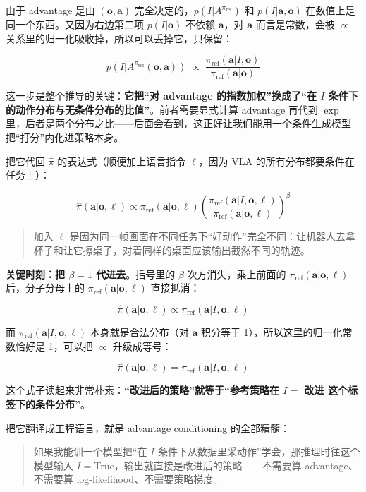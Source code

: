 \documentclass[
  chinese,
]{ctexart}
\begin{document}
由于 advantage 是由 \((\mathbf{o},\mathbf{a})\)
完全决定的，\(p(I|A^{\pi_\text{ref}})\) 和
\(p(I|\mathbf{a},\mathbf{o})\) 在数值上是同一个东西。又因为右边第二项
\(p(I|\mathbf{o})\) 不依赖 \(\mathbf{a}\)，对 \(\mathbf{a}\)
而言是常数，会被 \(\propto\)
关系里的归一化吸收掉，所以可以丢掉它，只保留：

\[
p(I | A^{\pi_\text{ref}}(\mathbf{o}, \mathbf{a})) \;\propto\; \frac{\pi_\text{ref}(\mathbf{a} | I, \mathbf{o})}{\pi_\text{ref}(\mathbf{a} | \mathbf{o})}
\]

这一步是整个推导的关键：\textbf{它把``对 advantage
的指数加权''换成了``在 \(I\)
条件下的动作分布与无条件分布的比值''}。前者需要显式计算 advantage 再代到
\(\exp\)
里，后者是两个分布之比------后面会看到，这正好让我们能用一个条件生成模型把``打分''内化进策略本身。

把它代回 \(\hat{\pi}\) 的表达式（顺便加上语言指令 \(\ell\)，因为 VLA
的所有分布都要条件在任务上）：

\[
\hat{\pi}(\mathbf{a} | \mathbf{o}, \ell) \propto \pi_\text{ref}(\mathbf{a} | \mathbf{o}, \ell) \left(\frac{\pi_\text{ref}(\mathbf{a} | I, \mathbf{o}, \ell)}{\pi_\text{ref}(\mathbf{a} | \mathbf{o}, \ell)}\right)^\beta
\]

\begin{quote}
加入 \(\ell\)
是因为同一帧画面在不同任务下``好动作''完全不同：让机器人去拿杯子和让它擦桌子，对着同样的桌面应该输出截然不同的轨迹。
\end{quote}

\textbf{关键时刻：把 \(\beta = 1\) 代进去}。括号里的 \(\beta\)
次方消失，乘上前面的 \(\pi_\text{ref}(\mathbf{a}|\mathbf{o},\ell)\)
后，分子分母上的 \(\pi_\text{ref}(\mathbf{a}|\mathbf{o},\ell)\)
直接抵消：

\[
\hat{\pi}(\mathbf{a} | \mathbf{o}, \ell) \propto \pi_\text{ref}(\mathbf{a} | I, \mathbf{o}, \ell)
\]

而 \(\pi_\text{ref}(\mathbf{a}|I,\mathbf{o},\ell)\) 本身就是合法分布（对
\(\mathbf{a}\) 积分等于 1），所以这里的归一化常数恰好是 1，可以把
\(\propto\) 升级成等号：

\[
\hat{\pi}(\mathbf{a} | \mathbf{o}, \ell) = \pi_\text{ref}(\mathbf{a} | I, \mathbf{o}, \ell)
\]

这个式子读起来非常朴素：\textbf{``改进后的策略''就等于``参考策略在
\(I=\) 改进 这个标签下的条件分布''}。

把它翻译成工程语言，就是 advantage conditioning 的全部精髓：

\begin{quote}
如果我能训一个模型把``在 \(I\)
条件下从数据里采动作''学会，那推理时往这个模型输入
\(I=\)True，输出就直接是改进后的策略------不需要算 advantage、不需要算
log-likelihood、不需要策略梯度。
\end{quote}
\end{document}
